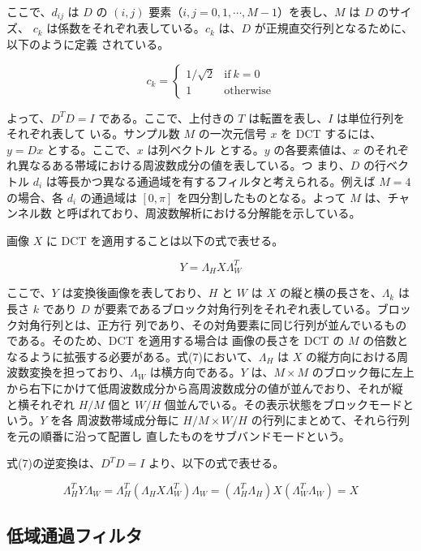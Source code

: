 \documentclass[dvipdfmx]{jsarticle}
\begin{document}
ここで、$d_{ij}$ は $D$ の $(i,j)$ 要素（$i,j=0,1,\cdots,M-1$）を表し、$M$ は $D$ のサイズ、
$c_k$ は係数をそれぞれ表している。$c_k$ は、$D$ が正規直交行列となるために、以下のように定義
されている。

\[
c_k=
\begin{cases}
1/\sqrt{2} & \mathrm{if}\ k=0 \\
1 & \mathrm{otherwise}
\end{cases}
\]

よって、$D^T D = I$ である。ここで、上付きの $T$ は転置を表し、$I$ は単位行列をそれぞれ表して
いる。サンプル数 $M$ の一次元信号 $x$ を DCT するには、$y=Dx$ とする。ここで、$x$ は列ベクトル
とする。$y$ の各要素値は、$x$ のそれぞれ異なるある帯域における周波数成分の値を表している。つ
まり、$D$ の行ベクトル $d_i$ は等長かつ異なる通過域を有するフィルタと考えられる。例えば
$M=4$ の場合、各 $d_i$ の通過域は $[0,\pi]$ を四分割したものとなる。よって $M$ は、チャンネル数
と呼ばれており、周波数解析における分解能を示している。

画像 $X$ に DCT を適用することは以下の式で表せる。

\begin{equation}
Y=\Lambda_H X \Lambda_W^T
\tag{7}
\end{equation}

ここで、$Y$ は変換後画像を表しており、$H$ と $W$ は $X$ の縦と横の長さを、$\Lambda_k$ は長さ $k$
であり $D$ が要素であるブロック対角行列をそれぞれ表している。ブロック対角行列とは、正方行
列であり、その対角要素に同じ行列が並んでいるものである。そのため、DCT を適用する場合は
画像の長さを DCT の $M$ の倍数となるように拡張する必要がある。式(7)において、$\Lambda_H$ は
$X$ の縦方向における周波数変換を担っており、$\Lambda_W$ は横方向である。$Y$ は、$M\times M$
のブロック毎に左上から右下にかけて低周波数成分から高周波数成分の値が並んでおり、それが縦
と横それぞれ $H/M$ 個と $W/H$ 個並んでいる。その表示状態をブロックモードという。$Y$ を各
周波数帯域成分毎に $H/M \times W/H$ の行列にまとめて、それら行列を元の順番に沿って配置し
直したものをサブバンドモードという。

式(7)の逆変換は、$D^T D = I$ より、以下の式で表せる。

\begin{equation}
\Lambda_H^T Y \Lambda_W
=
\Lambda_H^T
(
\Lambda_H X \Lambda_W^T
)
\Lambda_W
=
(
\Lambda_H^T \Lambda_H
)
X
(
\Lambda_W^T \Lambda_W
)
=
X
\tag{8}
\end{equation}

\subsection{低域通過フィルタ}
\end{document}
